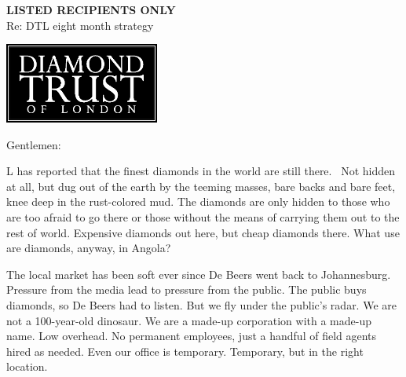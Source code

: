 \documentclass[12pt]{letter}
\begin{document}
\begin{letter}{{\bf LISTED RECIPIENTS ONLY}\\ \vspace{0.25in} Re: DTL eight month strategy}

\vspace*{-1.15in}
\begin{center}
\includegraphics[width=2in]{../logo_withFonts.eps}
\end{center}

\vspace*{-1.25in}

\address{
14 Greville St\\
Suite 77\\
London\\
EC1N 8BQ\\
UK\\
\\
+44 (0)20 7327 3080}

\date{April 28, 2000}

\signature{Jason Rohrer\\Acting President\\Diamond Trust of London}


\opening{Gentlemen:}

L has reported that the finest diamonds in the world are still there. \ Not hidden at all, but dug out of the earth by the teeming masses, bare backs and bare feet, knee deep in the rust-colored mud.  The diamonds are only hidden to those who are too afraid to go there or those without the means of carrying them out to the rest of world.  Expensive diamonds out here, but cheap diamonds there.  What use are diamonds, anyway, in Angola?

The local market has been soft ever since De Beers went back to Johannesburg.   Pressure from the media lead to pressure from the public.  The public buys diamonds, so De Beers had to listen.  But we fly under the public's radar.  We are not a 100-year-old dinosaur.  We are a made-up corporation with a made-up name.  Low overhead.  No permanent employees, just a handful of field agents hired as needed.  Even our office is temporary.  Temporary, but in the right location.  %


\end{letter}
\end{document}
